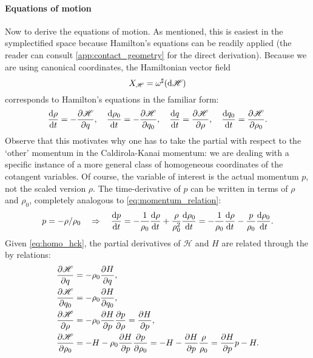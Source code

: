 \paragraph{Equations of motion} Now to derive the equations of motion. As mentioned, this is easiest in the symplectified space because Hamilton's equations can be readily applied (the reader can consult \cref{app:contact_geometry} for the direct derivation). Because we are using canonical coordinates, the Hamiltonian vector field
\begin{equation}
    X_\mathscr{H} = \omega^\sharp(\dd{\mathscr{H}})
    \label{eq:ham_vf}
\end{equation}
corresponds to Hamilton's equations in the familiar form:
\begin{equation}
    \dv{\rho}{t} = -\pdv{\mathscr{H}}{q},\quad
        \dv{\rho_0}{t} = -\pdv{\mathscr{H}}{q_0},\quad
        \dv{q}{t} = \pdv{\mathscr{H}}{\rho},\quad
        \dv{q_0}{t} = \pdv{\mathscr{H}}{\rho_0}.
\end{equation}
Observe that this motivates why one has to take the partial with respect to the `other' momentum in the Caldirola-Kanai momentum: we are dealing with a specific instance of a more general class of homogeneous coordinates of the cotangent variables. Of course, the variable of interest is the actual momentum $p$, not the scaled version $\rho$. The time-derivative of $p$ can be written in terms of $\rho$ and $\rho_0$, completely analogous to \cref{eq:momentum_relation}:
\begin{equation}
    p = -\rho/\rho_0 \quad\Rightarrow\quad \dv{p}{t} = -\frac{1}{\rho_0}\dv{\rho}{t} + \frac{\rho}{\rho_0^2}\dv{\rho_0}{t} = -\frac{1}{\rho_0}\dv{\rho}{t} - \frac{p}{\rho_0}\dv{\rho_0}{t}. 
    \label{eq:homo_momenta}
\end{equation}
Given \cref{eq:homo_hck}, the partial derivatives of $\mathscr{H}$ and $H$ are related through the by relations: \cite{Arnold1989}
\begin{equation}
    \begin{split}
        \pdv{\mathscr{H}}{q} &= -\rho_0 \pdv{H}{q}, \\
        \pdv{\mathscr{H}}{q_0} &= -\rho_0 \pdv{H}{q_0}, \\
        \pdv{\mathscr{H}}{\rho} &= -\rho_0 \pdv{H}{p}\pdv{p}{\rho} = \pdv{H}{p}, \\
        \pdv{\mathscr{H}}{\rho_0} &= -H - \rho_0 \pdv{H}{p}\pdv{p}{\rho_0} = -H - \pdv{H}{p}\frac{\rho}{\rho_0} = \pdv{H}{p}p - H.\\
    \end{split}
    \label{eq:partial_relation}
\end{equation}

